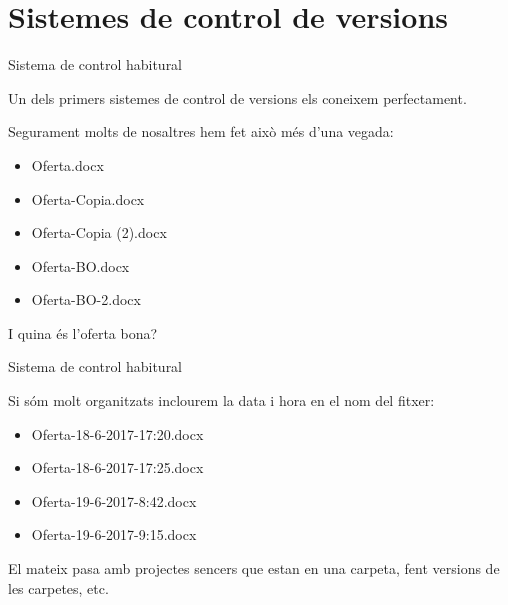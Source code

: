 \documentclass[10pt,xcolor={rgb}]{beamer}
\begin{document}
    \section{Sistemes de control de versions}
    
    \begin{frame}[fragile]{Sistema de control habitural}

      Un dels primers sistemes de control de versions els coneixem perfectament. 
      \begin{block}{Segurament molts de nosaltres hem fet això més d'una vegada:}
      \begin{itemize}
        \item Oferta.docx
        \item Oferta-Copia.docx
        \item Oferta-Copia (2).docx
        \item Oferta-BO.docx
        \item Oferta-BO-2.docx
      \end{itemize}
      \end{block}
      I quina és l'oferta bona?
    \end{frame}

    \begin{frame}[fragile]{Sistema de control habitural}
      
      \begin{block}{Si sóm molt organitzats inclourem la data i hora en el nom del fitxer:}
            
            \begin{itemize}
              \item Oferta-18-6-2017-17:20.docx
              \item Oferta-18-6-2017-17:25.docx
              \item Oferta-19-6-2017-8:42.docx
              \item Oferta-19-6-2017-9:15.docx
            \end{itemize}

      \end{block}
      El mateix pasa amb projectes sencers que estan en una carpeta, fent versions de les carpetes, etc.
    \end{frame}
          
\end{document}
